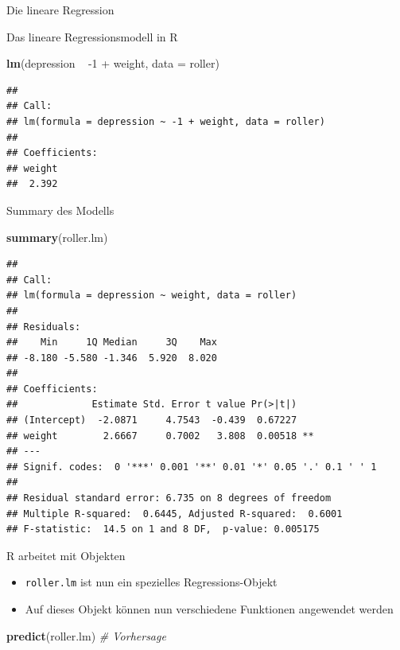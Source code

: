 \documentclass[ignorenonframetext,]{beamer}
\newenvironment{Shaded}{}{}
\newcommand{\KeywordTok}[1]{\textcolor[rgb]{0.00,0.44,0.13}{\textbf{{#1}}}}
\newcommand{\DataTypeTok}[1]{\textcolor[rgb]{0.56,0.13,0.00}{{#1}}}
\newcommand{\DecValTok}[1]{\textcolor[rgb]{0.25,0.63,0.44}{{#1}}}
\newcommand{\StringTok}[1]{\textcolor[rgb]{0.25,0.44,0.63}{{#1}}}
\newcommand{\CommentTok}[1]{\textcolor[rgb]{0.38,0.63,0.69}{\textit{{#1}}}}
\newcommand{\NormalTok}[1]{{#1}}
\providecommand{\tightlist}{%
\setlength{\itemsep}{0pt}\setlength{\parskip}{0pt}}
\begin{document}
\begin{frame}[fragile]{Die lineare Regression}
\begin{block}{Das lineare Regressionsmodell in R}
\begin{Shaded}
\begin{Highlighting}[]
\KeywordTok{lm}\NormalTok{(depression ~}\StringTok{ }\NormalTok{-}\DecValTok{1} \NormalTok{+}\StringTok{ }\NormalTok{weight, }\DataTypeTok{data =} \NormalTok{roller)}
\end{Highlighting}
\end{Shaded}

\begin{verbatim}
## 
## Call:
## lm(formula = depression ~ -1 + weight, data = roller)
## 
## Coefficients:
## weight  
##  2.392
\end{verbatim}

\end{block}

\begin{block}{Summary des Modells}

\begin{Shaded}
\begin{Highlighting}[]
\KeywordTok{summary}\NormalTok{(roller.lm)}
\end{Highlighting}
\end{Shaded}

\begin{verbatim}
## 
## Call:
## lm(formula = depression ~ weight, data = roller)
## 
## Residuals:
##    Min     1Q Median     3Q    Max 
## -8.180 -5.580 -1.346  5.920  8.020 
## 
## Coefficients:
##             Estimate Std. Error t value Pr(>|t|)   
## (Intercept)  -2.0871     4.7543  -0.439  0.67227   
## weight        2.6667     0.7002   3.808  0.00518 **
## ---
## Signif. codes:  0 '***' 0.001 '**' 0.01 '*' 0.05 '.' 0.1 ' ' 1
## 
## Residual standard error: 6.735 on 8 degrees of freedom
## Multiple R-squared:  0.6445, Adjusted R-squared:  0.6001 
## F-statistic:  14.5 on 1 and 8 DF,  p-value: 0.005175
\end{verbatim}

\end{block}

\begin{block}{R arbeitet mit Objekten}

\begin{itemize}
\tightlist
\item
  \texttt{roller.lm} ist nun ein spezielles Regressions-Objekt
\item
  Auf dieses Objekt können nun verschiedene Funktionen angewendet werden
\end{itemize}

\begin{Shaded}
\begin{Highlighting}[]
\KeywordTok{predict}\NormalTok{(roller.lm) }\CommentTok{# Vorhersage}
\end{Highlighting}
\end{Shaded}


\end{block}
\end{frame}
\end{document}
